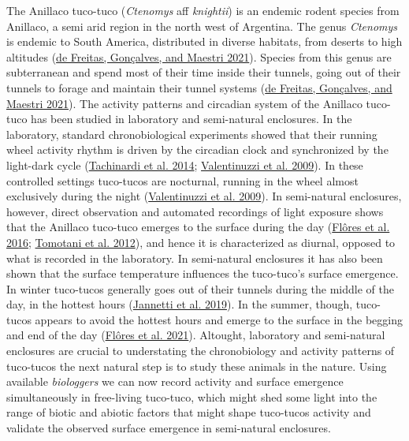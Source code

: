 \documentclass[msc,numbers,hidelinks]{coppe}
\begin{document}
  The Anillaco tuco-tuco (\emph{Ctenomys} aff \emph{knightii}) is an endemic rodent species from Anillaco, a semi arid region in the north west of Argentina. The genus \emph{Ctenomys} is endemic to South America, distributed in diverse habitats, from deserts to high altitudes (\protect\hyperlink{ref-freitas2021}{de Freitas, Gonçalves, and Maestri 2021}). Species from this genus are subterranean and spend most of their time inside their tunnels, going out of their tunnels to forage and maintain their tunnel systems (\protect\hyperlink{ref-freitas2021}{de Freitas, Gonçalves, and Maestri 2021}). The activity patterns and circadian system of the Anillaco tuco-tuco has been studied in laboratory and semi-natural enclosures. In the laboratory, standard chronobiological experiments showed that their running wheel activity rhythm is driven by the circadian clock and synchronized by the light-dark cycle (\protect\hyperlink{ref-tachinardi2014}{Tachinardi et al. 2014}; \protect\hyperlink{ref-valentinuzzi2009}{Valentinuzzi et al. 2009}). In these controlled settings tuco-tucos are nocturnal, running in the wheel almost exclusively during the night (\protect\hyperlink{ref-valentinuzzi2009}{Valentinuzzi et al. 2009}). In semi-natural enclosures, however, direct observation and automated recordings of light exposure shows that the Anillaco tuco-tuco emerges to the surface during the day (\protect\hyperlink{ref-flores2016}{Flôres et al. 2016}; \protect\hyperlink{ref-tomotani2012}{Tomotani et al. 2012}), and hence it is characterized as diurnal, opposed to what is recorded in the laboratory. In semi-natural enclosures it has also been shown that the surface temperature influences the tuco-tuco's surface emergence. In winter tuco-tucos generally goes out of their tunnels during the middle of the day, in the hottest hours (\protect\hyperlink{ref-jannetti2019}{Jannetti et al. 2019}). In the summer, though, tuco-tucos appears to avoid the hottest hours and emerge to the surface in the begging and end of the day (\protect\hyperlink{ref-flores2021}{Flôres et al. 2021}). Altought, laboratory and semi-natural enclosures are crucial to understating the chronobiology and activity patterns of tuco-tucos the next natural step is to study these animals in the nature. Using available \emph{biologgers} we can now record activity and surface emergence simultaneously in free-living tuco-tuco, which might shed some light into the range of biotic and abiotic factors that might shape tuco-tucos activity and validate the observed surface emergence in semi-natural enclosures.
\end{document}
